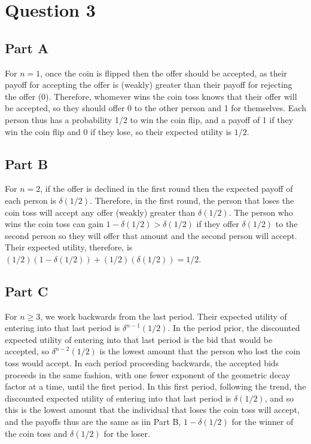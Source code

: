\documentclass[11pt]{article} %
\begin{document}
\section{Question 3}
\subsection{Part A}
For $n=1$, once the coin is flipped then the offer should be accepted, as their payoff for accepting the offer is (weakly) greater than their payoff for rejecting the offer (0). Therefore, whomever wins the coin toss knows that their offer will be accepted, so they should offer 0 to the other person and 1 for themselves. Each person thus has a probability 1/2 to win the coin flip, and a payoff of 1 if they win the coin flip and 0 if they lose, so their expected utility is $1/2$.
\subsection{Part B}
For $n=2$, if the offer is declined in the first round then the expected payoff of each person is $\delta (1/2)$. Therefore, in the first round, the person that loses the coin toss will accept any offer (weakly) greater than $\delta (1/2)$. The person who wins the coin toss can gain $1-\delta(1/2)>\delta(1/2)$ if they offer $\delta(1/2)$ to the second person so they will offer that amount and the second person will accept. Their expected utility, therefore, is $(1/2)(1-\delta(1/2)) + (1/2)(\delta(1/2)) = 1/2$.
\subsection{Part C}
For $n\geq 3$, we work backwards from the last period. Their expected utility of entering into that last period is $\delta^{n-1}(1/2)$. In the period prior, the discounted expected utility of entering into that last period is the bid that would be accepted, so $\delta^{n-2}(1/2)$ is the lowest amount that the person who lost the coin toss would accept. In each period proceeding backwards, the accepted bids proceeds in the same fashion, with one fewer exponent of the geometric decay factor at a time, until the first period. In this first period, following the trend, the discounted expected utility of entering into that last period is $\delta(1/2)$, and so this is the lowest amount that the individual that loses the coin toss will accept, and the payoffs thus are the same as iin Part B, $1-\delta(1/2)$ for the winner of the coin toss and $\delta(1/2)$ for the loser.
\end{document}

